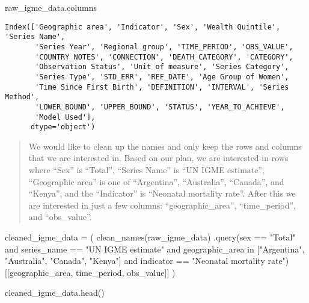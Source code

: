 \documentclass[
  letterpaper,
  DIV=11,
  numbers=noendperiod]{scrreprt}
\newenvironment{Shaded}{\begin{snugshade}}{\end{snugshade}}
\newcommand{\NormalTok}[1]{\textcolor[rgb]{0.00,0.23,0.31}{#1}}
\newcommand{\OperatorTok}[1]{\textcolor[rgb]{0.37,0.37,0.37}{#1}}
\newcommand{\StringTok}[1]{\textcolor[rgb]{0.13,0.47,0.30}{#1}}
\begin{document}
\begin{Shaded}
\begin{Highlighting}[]
\NormalTok{raw\_igme\_data.columns}
\end{Highlighting}
\end{Shaded}

\begin{verbatim}
Index(['Geographic area', 'Indicator', 'Sex', 'Wealth Quintile', 'Series Name',
       'Series Year', 'Regional group', 'TIME_PERIOD', 'OBS_VALUE',
       'COUNTRY_NOTES', 'CONNECTION', 'DEATH_CATEGORY', 'CATEGORY',
       'Observation Status', 'Unit of measure', 'Series Category',
       'Series Type', 'STD_ERR', 'REF_DATE', 'Age Group of Women',
       'Time Since First Birth', 'DEFINITION', 'INTERVAL', 'Series Method',
       'LOWER_BOUND', 'UPPER_BOUND', 'STATUS', 'YEAR_TO_ACHIEVE',
       'Model Used'],
      dtype='object')
\end{verbatim}

\begin{quote}
We would like to clean up the names and only keep the rows and columns
that we are interested in. Based on our plan, we are interested in rows
where ``Sex'' is ``Total'', ``Series Name'' is ``UN IGME estimate'',
``Geographic area'' is one of ``Argentina'', ``Australia'', ``Canada'',
and ``Kenya'', and the ``Indicator'' is ``Neonatal mortality rate''.
After this we are interested in just a few columns:
``geographic\_area'', ``time\_period'', and ``obs\_value''.
\end{quote}

\begin{Shaded}
\begin{Highlighting}[]
\NormalTok{cleaned\_igme\_data }\OperatorTok{=}\NormalTok{ (}
\NormalTok{    clean\_names(raw\_igme\_data)}
\NormalTok{    .query(}\StringTok{\textquotesingle{}sex == "Total" and series\_name == "UN IGME estimate" and \textquotesingle{}}
           \StringTok{\textquotesingle{}geographic\_area in ["Argentina", "Australia", "Canada", "Kenya"] and \textquotesingle{}}
           \StringTok{\textquotesingle{}indicator == "Neonatal mortality rate"\textquotesingle{}}\NormalTok{)}
\NormalTok{    [[}\StringTok{\textquotesingle{}geographic\_area\textquotesingle{}}\NormalTok{, }\StringTok{\textquotesingle{}time\_period\textquotesingle{}}\NormalTok{, }\StringTok{\textquotesingle{}obs\_value\textquotesingle{}}\NormalTok{]]}
\NormalTok{)}

\NormalTok{cleaned\_igme\_data.head()}
\end{Highlighting}
\end{Shaded}
\end{document}
